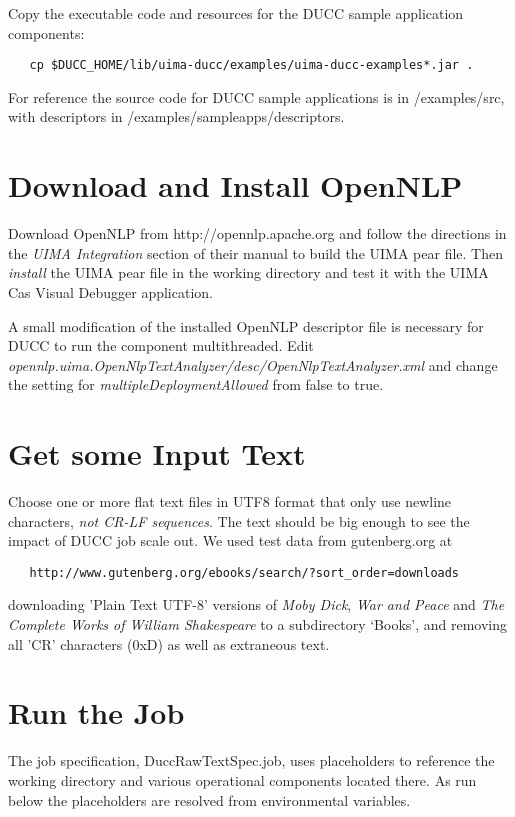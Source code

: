 Copy the executable code and resources for the DUCC sample application components:
\begin{verbatim}
   cp $DUCC_HOME/lib/uima-ducc/examples/uima-ducc-examples*.jar .
\end{verbatim}

For reference the source code for DUCC sample applications is in \ducchome/examples/src,
with descriptors in \ducchome/examples/sampleapps/descriptors.

\section{Download and Install OpenNLP}
Download OpenNLP from http://opennlp.apache.org and follow the directions in the
{\em UIMA Integration} section of their manual to build the UIMA pear file.
Then {\em install} the UIMA pear file in the working directory and
test it with the UIMA Cas Visual Debugger application.

A small modification of the installed OpenNLP descriptor file
is necessary for DUCC to run the component multithreaded. 
Edit {\em opennlp.uima.OpenNlpTextAnalyzer/desc/OpenNlpTextAnalyzer.xml}
and change the setting for {\em multipleDeploymentAllowed} from false to true.

\section{Get some Input Text}
Choose one or more flat text files in UTF8 format that only use newline characters,
{\em not CR-LF sequences}.
The text should be big enough to see the impact of DUCC job scale out.
We used test data from gutenberg.org at
\begin{verbatim}
   http://www.gutenberg.org/ebooks/search/?sort_order=downloads
\end{verbatim}
downloading 'Plain Text UTF-8' versions of {\em Moby Dick}, {\em War and Peace} and {\em The Complete Works of William Shakespeare} 
to a subdirectory `Books', and removing all 'CR' characters (0xD) as well as extraneous text.

\section{Run the Job}
The job specification, DuccRawTextSpec.job, uses placeholders to reference the working directory
and various operational components located there. As run below the placeholders are resolved
from environmental variables.

